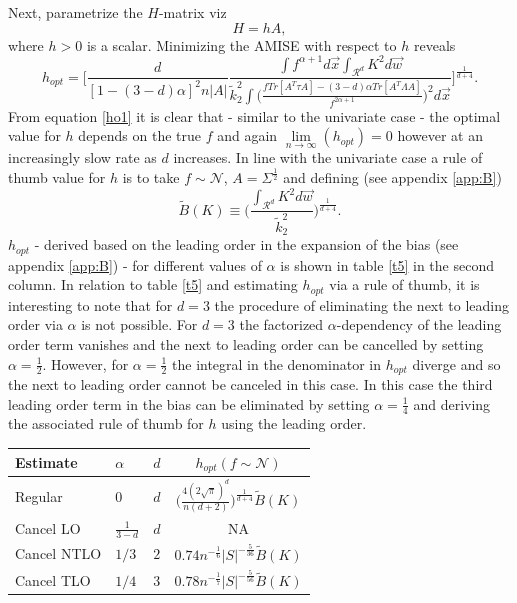 Next, parametrize the $H$-matrix viz
\begin{equation}
	H=hA,
	\label{H}
\end{equation}
where $h>0$ is a scalar. Minimizing the AMISE with respect to $h$ reveals
\begin{equation}
	h_{opt}= \bigg[\frac{d}{[1-(3-d)\alpha]^2n|A|}\frac{\int f^{\alpha+1}d\vec{x}  \int_{\mathcal{R}^d} K^2d\vec{w}}{\tilde{k}_2^2\int \big(\frac{fTr[A^T\tau A]-(3-d)\alpha Tr[A^T\Lambda A]}{f^{2\alpha+1}}\big)^2d\vec{x}}\bigg]^{\frac{1}{d+4}}.
	\label{ho1}
\end{equation}
From equation \eqref{ho1} it is clear that - similar to the univariate case - the optimal value for $h$ depends on the true $f$ and again $\lim\limits_{n\rightarrow \infty}(h_{opt})=0$ however at an increasingly slow rate as $d$ increases. In line with the univariate case a rule of thumb value for $h$ is to take $f\sim\mathcal{N}$, $A=\Sigma^\frac{1}{2}$ and defining (see appendix \ref{app:B})
\begin{equation}
	\tilde{B}(K)\equiv \bigg(\frac{\int_{\mathcal{R}^d} K^2d\vec{w}}{\tilde{k}_2^2}\bigg)^\frac{1}{d+4}.
\end{equation} 
$h_{opt}$ - derived based on the leading order in the expansion of the bias (see appendix \ref{app:B}) - for different values of $\alpha$ is shown in table \ref{t5} in the second column. In relation to table \ref{t5} and estimating $h_{opt}$ via a rule of thumb, it is interesting to note that for $d=3$ the procedure of eliminating the next to leading order via $\alpha$ is not possible. For $d=3$ the factorized $\alpha$-dependency of the leading order term vanishes and the next to leading order can be cancelled by setting $\alpha=\frac{1}{2}$. However, for $\alpha=\frac{1}{2}$ the integral in the denominator in $h_{opt}$ diverge and so the next to leading order cannot be canceled in this case. In this case the third leading order term in the bias can be eliminated by setting $\alpha=\frac{1}{4}$ and deriving the associated rule of thumb for $h$ using the leading order.
\begin{center}
	\begin{tabular}{ l|l|l| c|}
		Estimate &$\alpha$ & $d$ & $h_{opt}(f\sim \mathcal{N})$  \\
		\hline
		Regular & $0$ & $d$ & $\big(\frac{4(2\sqrt{\pi})^d}{n(d+2)}\big)^\frac{1}{d+4}\tilde{B}(K)$  \\
		Cancel LO& $\frac{1}{3-d}$ & $d$ & NA\\
		Cancel NTLO &$1/3$ &$2$ & $0.74n^{-\frac{1}{6}}|S|^{-\frac{5}{36}}\tilde{B}(K)$ \\
		Cancel TLO &$1/4$ &$3$ & $0.78n^{-\frac{1}{7}}|S|^{-\frac{5}{56}}\tilde{B}(K)$ \\
	\end{tabular}
	\captionsetup{width=0.95\textwidth}
	\label{t5}
\end{center}
